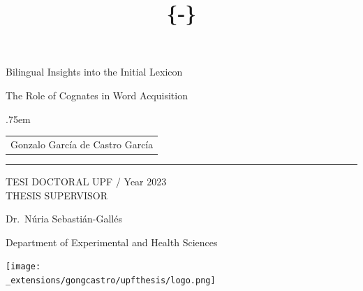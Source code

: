 \documentclass[
  12pt,
  b5paperpaper,
  twoside]{scrreprt}
\title{\{-\}}
\author{}
\date{}
\newcommand\blankpage{%
    \null
    \thispagestyle{empty}%
    \addtocounter{page}{-1}%
    \newpage
}
\begin{document}
\begin{titlepage}
  \begin{spacing}{1}
    \null\vfil
    \begin{flushleft}%
      {\LARGE \sffamily Bilingual Insights into the Initial
Lexicon \par}%
      \vspace*{1cm}
      {\Large \sffamily The Role of Cognates in Word Acquisition \par}%
      \vskip 1cm%
      {\large \lineskip .75em \begin{tabular}[t]{c} {\Huge Gonzalo
García de Castro García} \end{tabular}\par}
      \rule{\linewidth}{1mm} \par
      \vskip 1cm%
      {\large TESI DOCTORAL UPF / Year 2023}\\[2cm]
      {\normalsize THESIS SUPERVISOR}\par
      {\large Dr.~Núria Sebastián-Gallés}\par
      {\large Department of Experimental and Health Sciences} \par
      \vspace{2cm}
     \centering
      \texttt{[image: \\\_extensions/gongcastro/upfthesis/logo.png]}
     \end{flushleft}\par
     \afterpage{\blankpage}
    \end{spacing}
\end{titlepage}
\newpage
\end{document}

